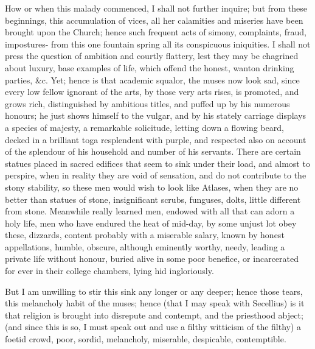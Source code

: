 How or when this malady commenced, I shall not further inquire; but from these
beginnings, this accumulation of vices, all her calamities and miseries have
been brought upon the Church; hence such frequent acts of simony, complaints,
fraud, impostures- from this one fountain spring all its conspicuous
iniquities. I shall not press the question of ambition and courtly flattery,
lest they may be chagrined about luxury, base examples of life, which offend
the honest, wanton drinking parties, \&c. Yet; hence is that academic squalor,
the muses now look sad, since every low fellow ignorant of the arts, by those
very arts rises, is promoted, and grows rich, distinguished by ambitious
titles, and puffed up by his numerous honours; he just shows himself to the
vulgar, and by his stately carriage displays a species of majesty, a remarkable
solicitude, letting down a flowing beard, decked in a brilliant toga
resplendent with purple, and respected also on account of the splendour of his
household and number of his servants. There are certain statues placed in
sacred edifices that seem to sink under their load, and almost to perspire,
when in reality they are void of sensation, and do not contribute to the stony
stability, so these men would wish to look like Atlases, when they are no
better than statues of stone, insignificant scrubs, funguses, dolts, little
different from stone. Meanwhile really learned men, endowed with all that can
adorn a holy life, men who have endured the heat of mid-day, by some unjust lot
obey these, dizzards, content probably with a miserable salary, known by honest
appellations, humble, obscure, although eminently worthy, needy, leading a
private life without honour, buried alive in some poor benefice, or
incarcerated for ever in their college chambers, lying hid ingloriously.

But I am unwilling to stir this sink any longer or any deeper; hence those
tears, this melancholy habit of the muses; hence (that I may speak with
Secellius) is it that religion is brought into disrepute and contempt, and the
priesthood abject; (and since this is so, I must speak out and use a filthy
witticism of the filthy) a foetid crowd, poor, sordid, melancholy, miserable,
despicable, contemptible.

